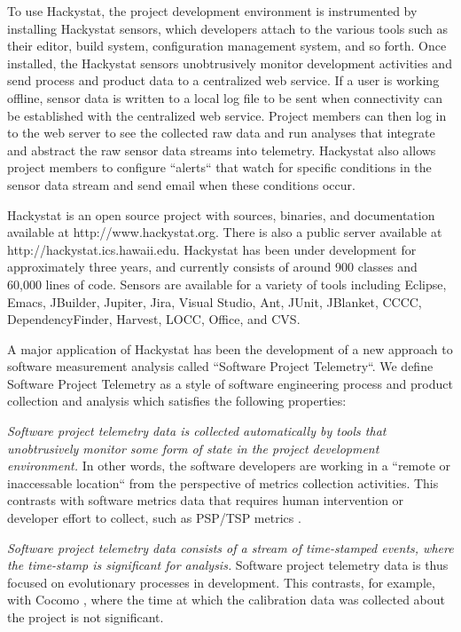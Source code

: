 \documentclass[10pt,twocolumn]{article}
\begin{document}
To use Hackystat, the project development environment is 
instrumented by installing Hackystat sensors, which developers attach
to the various tools such as their editor, build system, configuration
management system, and so forth. Once installed, the Hackystat sensors
unobtrusively monitor development activities and send process and
product data to a centralized web service.  If a user is working
offline, sensor data is written to a local log file to be sent
when connectivity can be established with the centralized web service.
Project members can then log in to the web server to see the collected
raw data and run analyses that integrate and abstract the raw sensor
data streams into telemetry.  Hackystat also allows project members to
configure ``alerts`` that watch for specific conditions in the
sensor data stream and send email when these conditions occur.

Hackystat is an open source project with sources, binaries, and
documentation available at http://www.hackystat.org.  There is also a
public server available at http://hackystat.ics.hawaii.edu.  Hackystat has
been under development for approximately three years, and currently
consists of around 900 classes and 60,000 lines of code.  Sensors are
available for a variety of tools including Eclipse, Emacs, JBuilder,
Jupiter, Jira, Visual Studio, Ant, JUnit, JBlanket, CCCC, DependencyFinder,
Harvest, LOCC, Office, and CVS.  

\label{sec:telemetry}

A major application of Hackystat has been the development of a new
approach to software measurement analysis called ``Software Project
Telemetry``. We define Software Project Telemetry as a style of
software engineering process and product collection and analysis which
satisfies the following properties:

{\em Software project telemetry data is collected automatically by tools
that unobtrusively monitor some form of state in the project development
environment.}  In other words, the software developers are working in a
``remote or inaccessable location`` from the perspective of metrics
collection activities. This contrasts with software metrics data that
requires human intervention or developer effort to collect, such as PSP/TSP
metrics \cite{Humphrey95}.
        
{\em Software project telemetry data consists of a stream of time-stamped
events, where the time-stamp is significant for analysis.}  Software
project telemetry data is thus focused on evolutionary processes in
development.  This contrasts, for example, with Cocomo \cite{Boehm81},
where the time at which the calibration data was collected about the
project is not significant.
\end{document}
